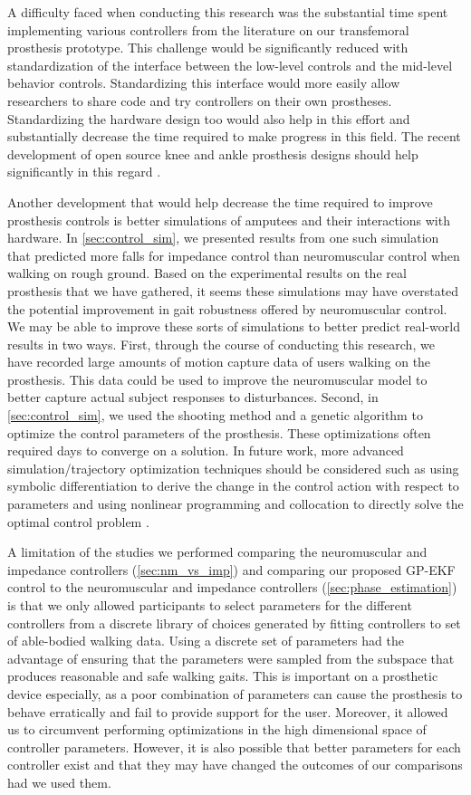A difficulty faced when conducting this research was the substantial time spent
implementing various controllers from the literature on our transfemoral
prosthesis prototype.  This challenge would be significantly reduced with
standardization of the interface between the low-level controls and the
mid-level behavior controls. Standardizing this interface would more easily
allow researchers to share code and try controllers on their own prostheses.
Standardizing the hardware design too would also help in this effort and
substantially decrease the time required to make progress in this field. The
recent development of open source knee and ankle prosthesis designs should help
significantly in this regard \citep{azocar2018design}.

Another development that would help decrease the time required to improve
prosthesis controls is better simulations of amputees and their interactions
with hardware. In \cref{sec:control_sim}, we presented results from one such
simulation that predicted more falls for impedance control than neuromuscular
control when walking on rough ground. Based on the experimental results on the
real prosthesis that we have gathered, it seems these simulations may have
overstated the potential improvement in gait robustness offered by neuromuscular
control. We may be able to improve these sorts of simulations to better predict
real-world results in two ways. First, through the course of conducting this
research, we have recorded large amounts of motion capture data of users walking
on the prosthesis. This data could be used to improve the neuromuscular model to
better capture actual subject responses to disturbances. Second, in
\cref{sec:control_sim}, we used the shooting method and a genetic algorithm
\citep{hansen2006cma} to optimize the control parameters of the prosthesis.
These optimizations often required days to converge on a solution. In future
work, more advanced simulation/trajectory optimization techniques should be
considered such as using symbolic differentiation to derive the change in the
control action with respect to parameters and using nonlinear programming and
collocation to directly solve the optimal control problem
\citep{hargraves1987direct}. 

A limitation of the studies we performed comparing the neuromuscular and
impedance controllers (\cref{sec:nm_vs_imp}) and comparing our proposed GP-EKF
control to the neuromuscular and impedance controllers
(\cref{sec:phase_estimation}) is that we only allowed participants to select
parameters for the different controllers from a discrete library of choices
generated by fitting controllers to set of able-bodied walking data. Using a
discrete set of parameters had the advantage of ensuring that the parameters
were sampled from the subspace that produces reasonable and safe walking gaits.
This is important on a prosthetic device especially, as a poor combination of
parameters can cause the prosthesis to behave erratically and fail to provide
support for the user. Moreover, it allowed us to circumvent performing
optimizations in the high dimensional space of controller parameters. However,
it is also possible that better parameters for each controller exist and that
they may have changed the outcomes of our comparisons had we used them. 

